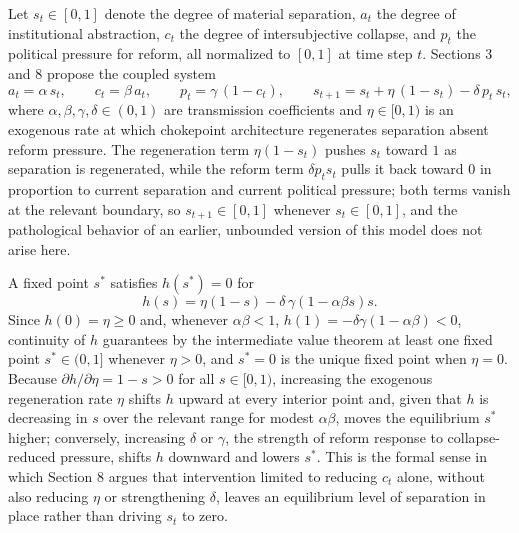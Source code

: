 \documentclass[11pt]{article}
\begin{document}
Let $s_t \in [0,1]$ denote the degree of material separation, $a_t$ the degree of institutional abstraction, $c_t$ the degree of intersubjective collapse, and $p_t$ the political pressure for reform, all normalized to $[0,1]$ at time step $t$. Sections 3 and 8 propose the coupled system
\[
a_t = \alpha \, s_t, \qquad c_t = \beta \, a_t, \qquad p_t = \gamma \, (1 - c_t), \qquad s_{t+1} = s_t + \eta \, (1 - s_t) - \delta \, p_t \, s_t,
\]
where $\alpha, \beta, \gamma, \delta \in (0,1)$ are transmission coefficients and $\eta \in [0,1)$ is an exogenous rate at which chokepoint architecture regenerates separation absent reform pressure. The regeneration term $\eta(1 - s_t)$ pushes $s_t$ toward $1$ as separation is regenerated, while the reform term $\delta p_t s_t$ pulls it back toward $0$ in proportion to current separation and current political pressure; both terms vanish at the relevant boundary, so $s_{t+1} \in [0,1]$ whenever $s_t \in [0,1]$, and the pathological behavior of an earlier, unbounded version of this model does not arise here.

A fixed point $s^{*}$ satisfies $h(s^{*}) = 0$ for
\[
h(s) = \eta(1-s) - \delta \, \gamma \left(1 - \alpha\beta s\right) s.
\]
Since $h(0) = \eta \geq 0$ and, whenever $\alpha \beta < 1$, $h(1) = -\delta\gamma(1 - \alpha\beta) < 0$, continuity of $h$ guarantees by the intermediate value theorem at least one fixed point $s^{*} \in (0,1]$ whenever $\eta > 0$, and $s^{*} = 0$ is the unique fixed point when $\eta = 0$. Because $\partial h / \partial \eta = 1 - s > 0$ for all $s \in [0,1)$, increasing the exogenous regeneration rate $\eta$ shifts $h$ upward at every interior point and, given that $h$ is decreasing in $s$ over the relevant range for modest $\alpha\beta$, moves the equilibrium $s^{*}$ higher; conversely, increasing $\delta$ or $\gamma$, the strength of reform response to collapse-reduced pressure, shifts $h$ downward and lowers $s^{*}$. This is the formal sense in which Section 8 argues that intervention limited to reducing $c_t$ alone, without also reducing $\eta$ or strengthening $\delta$, leaves an equilibrium level of separation in place rather than driving $s_t$ to zero.

\newpage
\end{document}
